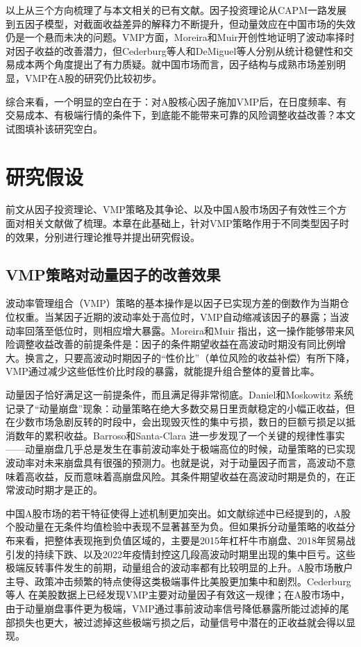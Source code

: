 \documentclass[
    decl-page,
    oneside,
  ]{njuthesis}
\begin{document}
以上从三个方向梳理了与本文相关的已有文献。因子投资理论从CAPM一路发展到五因子模型，对截面收益差异的解释力不断提升，但动量效应在中国市场的失效仍是一个悬而未决的问题。VMP方面，Moreira和Muir开创性地证明了波动率择时对因子收益的改善潜力，但Cederburg等人和DeMiguel等人分别从统计稳健性和交易成本两个角度提出了有力质疑。就中国市场而言，因子结构与成熟市场差别明显，VMP在A股的研究仍比较初步。

综合来看，一个明显的空白在于：对A股核心因子施加VMP后，在日度频率、有交易成本、有极端行情的条件下，到底能不能带来可靠的风险调整收益改善？本文试图填补该研究空白。


\chapter{研究假设}

前文从因子投资理论、VMP策略及其争论、以及中国A股市场因子有效性三个方面对相关文献做了梳理。本章在此基础上，针对VMP策略作用于不同类型因子时的效果，分别进行理论推导并提出研究假设。

\section{VMP策略对动量因子的改善效果}

波动率管理组合（VMP）策略的基本操作是以因子已实现方差的倒数作为当期仓位权重。当某因子近期的波动率处于高位时，VMP自动缩减该因子的暴露；当波动率回落至低位时，则相应增大暴露。Moreira和Muir \cite{moreira2017volatility} 指出，这一操作能够带来风险调整收益改善的前提条件是：因子的条件期望收益在高波动时期没有同比例增大。换言之，只要高波动时期因子的“性价比”（单位风险的收益补偿）有所下降，VMP通过减少这些低性价比时段的暴露，就能提升组合整体的夏普比率。

动量因子恰好满足这一前提条件，而且满足得非常彻底。Daniel和Moskowitz \cite{daniel2016momentum} 系统记录了“动量崩盘”现象：动量策略在绝大多数交易日里贡献稳定的小幅正收益，但在少数市场急剧反转的时段中，会出现毁灭性的集中亏损，数日的巨额亏损足以抵消数年的累积收益。Barroso和Santa-Clara \cite{barroso2015momentum} 进一步发现了一个关键的规律性事实——动量崩盘几乎总是发生在事前波动率处于极端高位的时候，动量策略的已实现波动率对未来崩盘具有很强的预测力。也就是说，对于动量因子而言，高波动不意味着高收益，反而意味着高崩盘风险。其条件期望收益在高波动时期是负的，在正常波动时期才是正的。

中国A股市场的若干特征使得上述机制更加突出。如文献综述中已经提到的，A股个股动量在无条件均值检验中表现不显著甚至为负。但如果拆分动量策略的收益分布来看，把整体表现拖到负值区域的，主要是2015年杠杆牛市崩盘、2018年贸易战引发的持续下跌、以及2022年疫情封控这几段高波动时期里出现的集中巨亏。这些极端反转事件发生的前期，动量组合的波动率都有比较明显的上升。A股市场散户主导、政策冲击频繁的特点使得这类极端事件比美股更加集中和剧烈。Cederburg等人 \cite{cederburg2020performance} 在美股数据上已经发现VMP主要对动量因子有效这一规律；在A股市场中，由于动量崩盘事件更为极端，VMP通过事前波动率信号降低暴露所能过滤掉的尾部损失也更大，被过滤掉这些极端亏损之后，动量信号中潜在的正收益就会得以显现。
\end{document}
